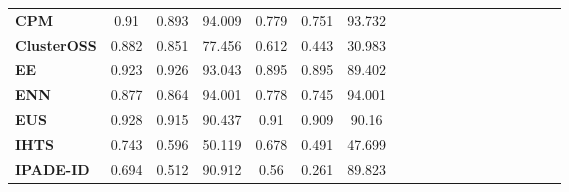 {{\begin{tabular}{l|cccccccccccccccccc}
\textbf{CPM} & \cellcolor[rgb]{ .988,  .886,  .898}0.91 & \cellcolor[rgb]{ .984,  .749,  .757}0.893 & \cellcolor[rgb]{ .98,  .698,  .71}94.009 & \cellcolor[rgb]{ .988,  .984,  .996}0.779 & \cellcolor[rgb]{ .988,  .969,  .98}0.751 & \cellcolor[rgb]{ .976,  .514,  .522}93.732 &       &       &       &       &       &       &       &       &       &       &       &  \\
\textbf{ClusterOSS} & \cellcolor[rgb]{ .914,  .937,  .973}0.882 & \cellcolor[rgb]{ .953,  .965,  .988}0.851 & \cellcolor[rgb]{ .757,  .824,  .918}77.456 & \cellcolor[rgb]{ .502,  .647,  .827}0.612 & \cellcolor[rgb]{ .588,  .706,  .859}0.443 & \cellcolor[rgb]{ .353,  .541,  .776}30.983 &       &       &       &       &       &       &       &       &       &       &       &  \\
\textbf{EE} & \cellcolor[rgb]{ .976,  .545,  .553}0.923 & \cellcolor[rgb]{ .973,  .412,  .42}0.926 & \cellcolor[rgb]{ .988,  .988,  1}93.043 & \cellcolor[rgb]{ .976,  .478,  .486}0.895 & \cellcolor[rgb]{ .976,  .463,  .471}0.895 & \cellcolor[rgb]{ .973,  .976,  .992}89.402 &       &       &       &       &       &       &       &       &       &       &       &  \\
\textbf{ENN} & \cellcolor[rgb]{ .898,  .925,  .969}0.877 & \cellcolor[rgb]{ .976,  .98,  .996}0.864 & \cellcolor[rgb]{ .98,  .702,  .71}94.001 & \cellcolor[rgb]{ .988,  .988,  1}0.778 & \cellcolor[rgb]{ .988,  .988,  1}0.745 & \cellcolor[rgb]{ .976,  .471,  .478}94.001 &       &       &       &       &       &       &       &       &       &       &       &  \\
\textbf{EUS} & \cellcolor[rgb]{ .973,  .412,  .42}0.928 & \cellcolor[rgb]{ .976,  .525,  .533}0.915 & \cellcolor[rgb]{ .949,  .961,  .984}90.437 & \cellcolor[rgb]{ .973,  .412,  .42}0.91 & \cellcolor[rgb]{ .973,  .412,  .42}0.909 & \cellcolor[rgb]{ .98,  .98,  .996}90.16 &       &       &       &       &       &       &       &       &       &       &       &  \\
\textbf{IHTS} & \cellcolor[rgb]{ .498,  .643,  .827}0.743 & \cellcolor[rgb]{ .502,  .643,  .827}0.596 & \cellcolor[rgb]{ .353,  .541,  .776}50.119 & \cellcolor[rgb]{ .694,  .78,  .894}0.678 & \cellcolor[rgb]{ .651,  .753,  .882}0.491 & \cellcolor[rgb]{ .529,  .663,  .835}47.699 &       &       &       &       &       &       &       &       &       &       &       &  \\
\textbf{IPADE-ID} & \cellcolor[rgb]{ .353,  .541,  .776}0.694 & \cellcolor[rgb]{ .353,  .541,  .776}0.512 & \cellcolor[rgb]{ .953,  .965,  .988}90.912 & \cellcolor[rgb]{ .353,  .541,  .776}0.56 & \cellcolor[rgb]{ .353,  .541,  .776}0.261 & \cellcolor[rgb]{ .976,  .98,  .996}89.823 &       &       &       &       &       &       &       &       &       &       &       &  \\

\end{tabular}}}
